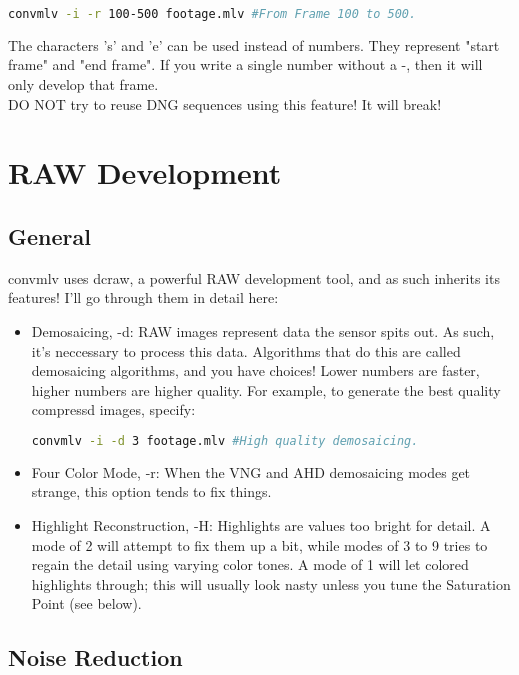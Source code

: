 \documentclass[a4paper,12pt]{article}
\begin{document}
\begin{lstlisting}[language=bash]
	convmlv -i -r 100-500 footage.mlv #From Frame 100 to 500.
\end{lstlisting}

	The characters 's' and 'e' can be used instead of numbers. They represent "start frame" and "end frame". If you write
	a single number without a -, then it will only develop that frame.\\
	
	DO NOT try to reuse DNG sequences using this feature! It will break!

\section{RAW Development}
	
	\subsection{General}
	
			convmlv uses dcraw, a powerful RAW development tool, and as such inherits its features! I'll go through them in detail here:
		
			\begin{itemize}
					\item Demosaicing, -d: RAW images represent data the sensor spits out. As such, it's neccessary to process
					this data. Algorithms that do this are called demosaicing algorithms, and you have choices! Lower numbers are faster,
					higher numbers are higher quality. For example, to generate the best quality compressd images, specify:
				
	\begin{lstlisting}[language=bash]
		convmlv -i -d 3 footage.mlv #High quality demosaicing.
	\end{lstlisting}

					\item Four Color Mode, -r: When the VNG and AHD demosaicing modes get strange, this option tends to fix things.
					\item Highlight Reconstruction, -H: Highlights are values too bright for detail. A mode of 2 will attempt to fix them up a bit, 
				while modes of 3 to 9 tries to regain the detail using varying color tones. A mode of 1 will let colored highlights through; this will
				usually look nasty unless you tune the Saturation Point (see below).
			\end{itemize}
			
		\subsection{Noise Reduction}
			
\end{document}
